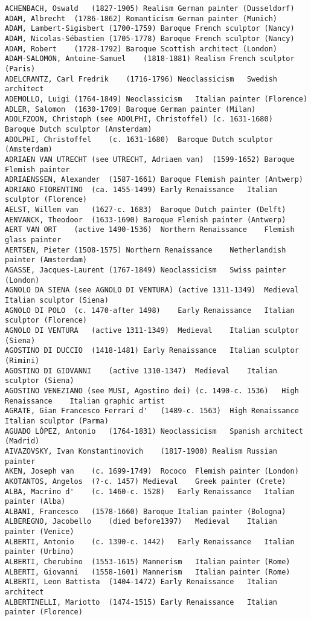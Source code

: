 \documentclass[11pt]{article}
\begin{document}
\begin{Verbatim}[commandchars=\\\{\}]
ACHENBACH, Oswald	(1827-1905)	Realism	German painter (Dusseldorf)
ADAM, Albrecht	(1786-1862)	Romanticism	German painter (Munich)
ADAM, Lambert-Sigisbert	(1700-1759)	Baroque	French sculptor (Nancy)
ADAM, Nicolas-Sébastien	(1705-1778)	Baroque	French sculptor (Nancy)
ADAM, Robert	(1728-1792)	Baroque	Scottish architect (London)
ADAM-SALOMON, Antoine-Samuel	(1818-1881)	Realism	French sculptor (Paris)
ADELCRANTZ, Carl Fredrik	(1716-1796)	Neoclassicism	Swedish architect
ADEMOLLO, Luigi	(1764-1849)	Neoclassicism	Italian painter (Florence)
ADLER, Salomon	(1630-1709)	Baroque	German painter (Milan)
ADOLFZOON, Christoph (see ADOLPHI, Christoffel)	(c. 1631-1680)	Baroque	Dutch sculptor (Amsterdam)
ADOLPHI, Christoffel	(c. 1631-1680)	Baroque	Dutch sculptor (Amsterdam)
ADRIAEN VAN UTRECHT (see UTRECHT, Adriaen van)	(1599-1652)	Baroque	Flemish painter
ADRIAENSSEN, Alexander	(1587-1661)	Baroque	Flemish painter (Antwerp)
ADRIANO FIORENTINO	(ca. 1455-1499)	Early Renaissance	Italian sculptor (Florence)
AELST, Willem van	(1627-c. 1683)	Baroque	Dutch painter (Delft)
AENVANCK, Theodoor	(1633-1690)	Baroque	Flemish painter (Antwerp)
AERT VAN ORT	(active 1490-1536)	Northern Renaissance	Flemish glass painter
AERTSEN, Pieter	(1508-1575)	Northern Renaissance	Netherlandish painter (Amsterdam)
AGASSE, Jacques-Laurent	(1767-1849)	Neoclassicism	Swiss painter (London)
AGNOLO DA SIENA (see AGNOLO DI VENTURA)	(active 1311-1349)	Medieval	Italian sculptor (Siena)
AGNOLO DI POLO	(c. 1470-after 1498)	Early Renaissance	Italian sculptor (Florence)
AGNOLO DI VENTURA	(active 1311-1349)	Medieval	Italian sculptor (Siena)
AGOSTINO DI DUCCIO	(1418-1481)	Early Renaissance	Italian sculptor (Rimini)
AGOSTINO DI GIOVANNI	(active 1310-1347)	Medieval	Italian sculptor (Siena)
AGOSTINO VENEZIANO (see MUSI, Agostino dei)	(c. 1490-c. 1536)	High Renaissance	Italian graphic artist
AGRATE, Gian Francesco Ferrari d'	(1489-c. 1563)	High Renaissance	Italian sculptor (Parma)
AGUADO LÓPEZ, Antonio	(1764-1831)	Neoclassicism	Spanish architect (Madrid)
AIVAZOVSKY, Ivan Konstantinovich	(1817-1900)	Realism	Russian painter
AKEN, Joseph van	(c. 1699-1749)	Rococo	Flemish painter (London)
AKOTANTOS, Angelos	(?-c. 1457)	Medieval	Greek painter (Crete)
ALBA, Macrino d'	(c. 1460-c. 1528)	Early Renaissance	Italian painter (Alba)
ALBANI, Francesco	(1578-1660)	Baroque	Italian painter (Bologna)
ALBEREGNO, Jacobello	(died before1397)	Medieval	Italian painter (Venice)
ALBERTI, Antonio	(c. 1390-c. 1442)	Early Renaissance	Italian painter (Urbino)
ALBERTI, Cherubino	(1553-1615)	Mannerism	Italian painter (Rome)
ALBERTI, Giovanni	(1558-1601)	Mannerism	Italian painter (Rome)
ALBERTI, Leon Battista	(1404-1472)	Early Renaissance	Italian architect
ALBERTINELLI, Mariotto	(1474-1515)	Early Renaissance	Italian painter (Florence)

    \end{Verbatim}
\end{document}
